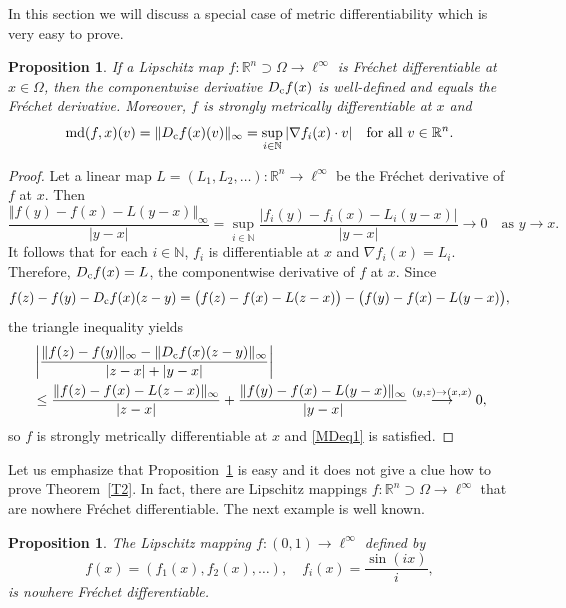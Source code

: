 \documentclass[12pt,leqno]{amsart}
\newtheorem{proposition}[theorem]{Proposition}
\theoremstyle{definition}
\newcommand{\bbbn}{\mathbb N}
\newcommand{\bbbr}{\mathbb R}
\def\md{\operatorname{md}}
\numberwithin{theorem}{section} \numberwithin{equation}{section}
\begin{document}
In this section we will discuss a special case of metric differentiability which is very easy to prove.
\begin{proposition}
\label{T4}
If a Lipschitz map $f:\bbbr^n\supset\Omega\to\ell^\infty$ is Fr\'echet differentiable at $x\in\Omega$, then the componentwise derivative $D_{\rm c}f(x)$ is well-defined and equals the Fr\'echet derivative. Moreover, $f$ is strongly metrically differentiable at $x$ and
\begin{equation}
\label{MDeq1}
\md(f,x)(v)=\|D_{\rm c}f(x)(v)\|_\infty=\sup_{i\in\bbbn} |\nabla f_i(x)\cdot v|
\quad
\text{for all } v\in\bbbr^n.
\end{equation}
\end{proposition}
\begin{proof}
Let a linear map $L=(L_1,L_2,\ldots):\bbbr^n\to\ell^\infty$ be the Fr\'echet derivative of $f$ at $x$. Then
$$
\frac{\Vert f(y)-f(x)-L(y-x)\Vert_\infty}{|y-x|}=\sup_{i\in\bbbn}\frac{|f_i(y)-f_i(x)-L_i(y-x)|}{|y-x|}\to 0
\quad
\text{as $y\to x$}.
$$
It follows that for each $i\in\bbbn$, $f_i$ is differentiable at $x$ and $\nabla f_i(x)=L_i$. Therefore, $D_{\rm c}f(x)=L$, the componentwise derivative of $f$ at $x$.
Since
$$
f(z)-f(y)-D_{\rm c}f(x)(z-y)=
\big(f(z)-f(x)-L(z-x)\big)-\big(f(y)-f(x)-L(y-x)\big),
$$
the triangle inequality yields
\[
\begin{split}
&\left|\frac{\Vert f(z)-f(y)\Vert_\infty-\Vert D_{\rm c}f(x)(z-y)\Vert_\infty}{|z-x|+|y-x|}\right|\\
&\leq
\frac{\Vert f(z)-f(x)-L(z-x)\Vert_\infty}{|z-x|}+
\frac{\Vert f(y)-f(x)-L(y-x)\Vert_\infty}{|y-x|}
\stackrel{(y,z)\to (x,x)}\longrightarrow 0,
\end{split}
\]
so $f$ is strongly metrically differentiable at $x$ and \eqref{MDeq1} is satisfied.
\end{proof}
Let us emphasize that Proposition~\ref{T4} is easy and it does not give a clue how to prove Theorem~\ref{T2}. In fact, there are Lipschitz mappings $f:\bbbr^n\supset\Omega\to\ell^\infty$ that are nowhere Fr\'echet differentiable. The next example is well known.
\begin{proposition}
\label{T5}
The Lipschitz mapping $f:(0,1)\to\ell^\infty$ defined by
$$
f(x)=(f_1(x),f_2(x),\ldots),
\quad
f_i(x)=\frac{\sin (ix)}{i},
$$
is nowhere Fr\'echet differentiable.
\end{proposition}
\end{document}
